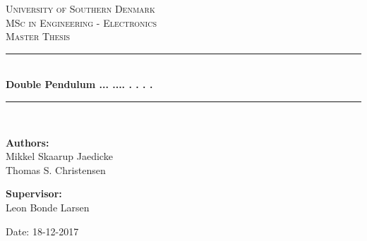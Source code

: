 \begin{titlepage}
\begin{center}

\textsc{\LARGE University of Southern Denmark}\\[1.5cm]
\textsc{\Large MSc in Engineering - Electronics}\\
\textsc{\large Master Thesis}\\[0.5cm]

\vfill
\vspace{3cm}
\hrule ~\\[0.3cm]
{ \LARGE \bfseries Double Pendulum ... .... . . . .\\[0.4cm] }
\hrule ~\\[1.5cm]

\vfill

\vspace{5cm}
\begin{minipage}[t]{.55\textwidth}
\begin{flushleft} \large
\textbf{Authors:}\\
Mikkel Skaarup Jaedicke\\
Thomas S. Christensen
\end{flushleft}
\end{minipage}
\begin{minipage}[t]{.44\textwidth}
\begin{flushright} \large
\textbf{Supervisor:} \\
Leon Bonde Larsen
\end{flushright}
\end{minipage}

\vspace{1cm}
Date: 18-12-2017

\vspace{1cm}

\end{center}
\end{titlepage}